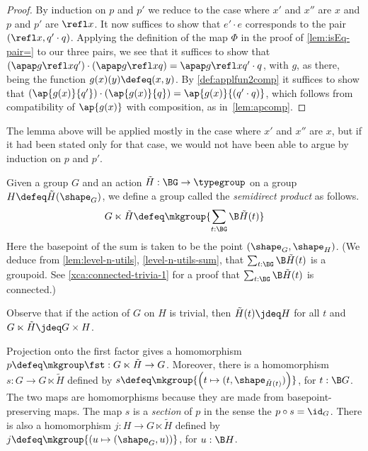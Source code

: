 \begin{proof}
  By induction on $p$ and $p'$ we reduce to the case where $x'$ and $x''$ are $x$ and $p$ and $p'$ are $\refl x$.
  It now suffices to show that $e' \cdot e$ corresponds to the pair $(\refl x , q' \cdot q)$.
  Applying the definition of the map $\Phi$ in the proof of \cref{lem:isEq-pair=} to our three pairs, we see that it suffices to show that
  $\left( \apap g {\refl x} {q'} \right) \cdot \left( \apap g {\refl x} {q} \right) = \apap g {\refl x} {q' \cdot q}$, with $g$, as there, being the function $ g(x)(y) \defeq (x,y)$.
  By \cref{def:applfun2comp} it suffices to show that $\left( \ap {g(x)} {q'} \right) \cdot \left( \ap {g(x)} {q} \right) = \ap {g(x)} {(q' \cdot q)}$, which follows from
  compatibility of $\ap {g(x)}$ with composition, as in~\cref{lem:apcomp}.
\end{proof}

The lemma above will be applied mostly in the case where $x'$ and $x''$ are $x$, but if it had been stated only for that case, we would not have
been able to argue by induction on $p$ and $p'$.

\begin{definition}\label{def:semidirect-product}
  Given a group $G$ and an action $\tilde H : \BG \to \typegroup$ on a group $H \defeq \tilde H(\shape_G)$, we define a group called the {\em
    semidirect product} as follows.
  $$G \ltimes \tilde H \defeq \mkgroup { \sum_{t:\BG} \B \tilde H(t) }$$
  Here the basepoint of the sum is taken to be the point $(\shape_G,\shape_H)$.
  (We deduce from \cref{lem:level-n-utils}, \cref{level-n-utils-sum}, that $\sum_{t:\BG} \B \tilde H(t)$ is a groupoid.
  See \cref{xca:connected-trivia-1} for a proof that
  $\sum_{t:\BG} \B \tilde H(t)$ is connected.)
\end{definition}

Observe that if the action of $G$ on $H$ is trivial, then $\tilde H(t) \jdeq H$ for all $t$ and $G \ltimes \tilde H \jdeq G \times H$.

Projection onto the first factor gives a homomorphism $p \defeq \mkgroup \fst : G \ltimes \tilde H \to G$.
Moreover, there is a homomorphism $s : G \to G \ltimes \tilde H$ defined by
$ s \defeq \mkgroup {\left( t \mapsto (t,\shape_{\tilde H(t)}) \right) }$, for $t : \B G$.
The two maps are homomorphisms because they are made from basepoint-preserving maps.
The map $s$ is a \emph{section} of $p$ in the sense the $p \circ s = \id_G$.
There is also a homomorphism $j : H \to G \ltimes \tilde H$ defined by $j \defeq \mkgroup { \left( u \mapsto (\shape_G,u) \right) }$, for $u : \B H$.

